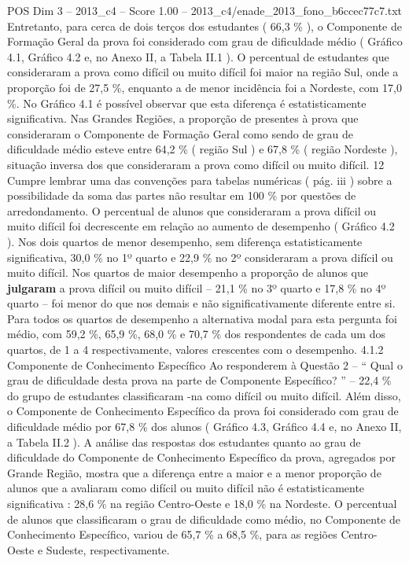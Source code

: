 \begin{textsample}{POS Dim 3 – 2013\_c4 – Score 1.00 – 2013\_c4/enade\_2013\_fono\_b6ccec77c7.txt}
Entretanto, para cerca de dois terços dos estudantes ( 66,3 \% ), o Componente de Formação Geral da prova foi considerado com grau de dificuldade médio ( Gráfico 4.1, Gráfico 4.2 e, no Anexo II, a Tabela II.1 ).
O percentual de estudantes que consideraram a prova como difícil ou muito difícil foi maior na região Sul, onde a proporção foi de 27,5 \%, enquanto a de menor incidência foi a Nordeste, com 17,0 \%.
No Gráfico 4.1 é possível observar que esta diferença é estatisticamente significativa.
Nas Grandes Regiões, a proporção de presentes à prova que consideraram o Componente de Formação Geral como sendo de grau de dificuldade médio esteve entre 64,2 \% ( região Sul ) e 67,8 \% ( região Nordeste ), situação inversa dos que consideraram a prova como difícil ou muito difícil. 12 Cumpre lembrar uma das convenções para tabelas numéricas ( pág. iii ) sobre a possibilidade da soma das partes não resultar em 100 \% por questões de arredondamento.
O percentual de alunos que consideraram a prova difícil ou muito difícil foi decrescente em relação ao aumento de desempenho ( Gráfico 4.2 ).
Nos dois quartos de menor desempenho, sem diferença estatisticamente significativa, 30,0 \% no 1º quarto e 22,9 \% no 2º consideraram a prova difícil ou muito difícil.
Nos quartos de maior desempenho a proporção de alunos que \textbf{julgaram} a prova difícil ou muito difícil – 21,1 \% no 3º quarto e 17,8 \% no 4º quarto – foi menor do que nos demais e não significativamente diferente entre si.
Para todos os quartos de desempenho a alternativa modal para esta pergunta foi médio, com 59,2 \%, 65,9 \%, 68,0 \% e 70,7 \% dos respondentes de cada um dos quartos, de 1 a 4 respectivamente, valores crescentes com o desempenho. 4.1.2 Componente de Conhecimento Específico Ao responderem à Questão 2 – “ Qual o grau de dificuldade desta prova na parte de Componente Específico? ” – 22,4 \% do grupo de estudantes classificaram -na como difícil ou muito difícil.
Além disso, o Componente de Conhecimento Específico da prova foi considerado com grau de dificuldade médio por 67,8 \% dos alunos ( Gráfico 4.3, Gráfico 4.4 e, no Anexo II, a Tabela II.2 ).
A análise das respostas dos estudantes quanto ao grau de dificuldade do Componente de Conhecimento Específico da prova, agregados por Grande Região, mostra que a diferença entre a maior e a menor proporção de alunos que a avaliaram como difícil ou muito difícil não é estatisticamente significativa : 28,6 \% na região Centro-Oeste e 18,0 \% na Nordeste.
O percentual de alunos que classificaram o grau de dificuldade como médio, no Componente de Conhecimento Específico, variou de 65,7 \% a 68,5 \%, para as regiões Centro-Oeste e Sudeste, respectivamente.

\end{textsample}
